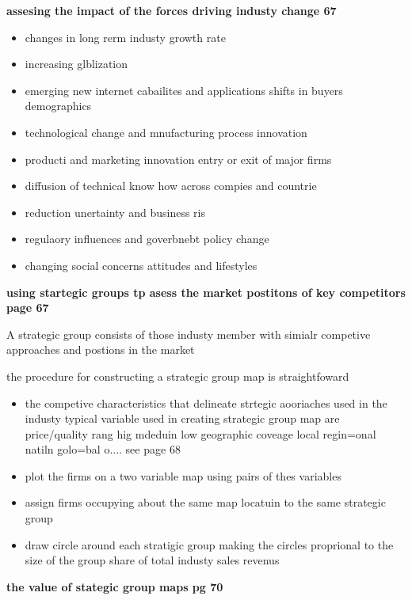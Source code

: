 \documentclass{report}
\begin{document}
{\huge\textbf{assesing the impact of the forces driving industy change 67}}
\begin{itemize}
\item changes in long rerm industy growth rate 
\item increasing glblization 
\item emerging new internet cabailites and applications shifts in buyers demographics 
\item technological change and mnufacturing process innovation 
\item producti and marketing innovation entry or exit of major firms 
\item diffusion of technical know how across compies and countrie 
\item reduction unertainty and business ris  
\item regulaory influences and goverbnebt policy change 
\item changing social concerns attitudes and lifestyles 

\end{itemize}

{\huge\textbf{using startegic groups tp asess the market postitons of key competitors page 67}}

A strategic  group consists of those industy member with simialr competive approaches and postions in the market 

the procedure for constructing a strategic group map is straightfoward 


\begin{itemize}
\item the competive characteristics that delineate strtegic aooriaches used in the industy typical variable used in creating strategic group map are price/quality rang hig mdeduin low geographic coveage local regin=onal natiln golo=bal o.... see page 68
\item plot the firms on a two variable map using pairs of thes variables 
\item  assign firms occupying  about the same map locatuin to the same strategic group 
\item draw circle around each stratigic group making the circles proprional to the size of the group share of total industy sales  revenus 


\end{itemize}



{\huge\textbf{the value of stategic group maps pg 70}}
\end{document}
